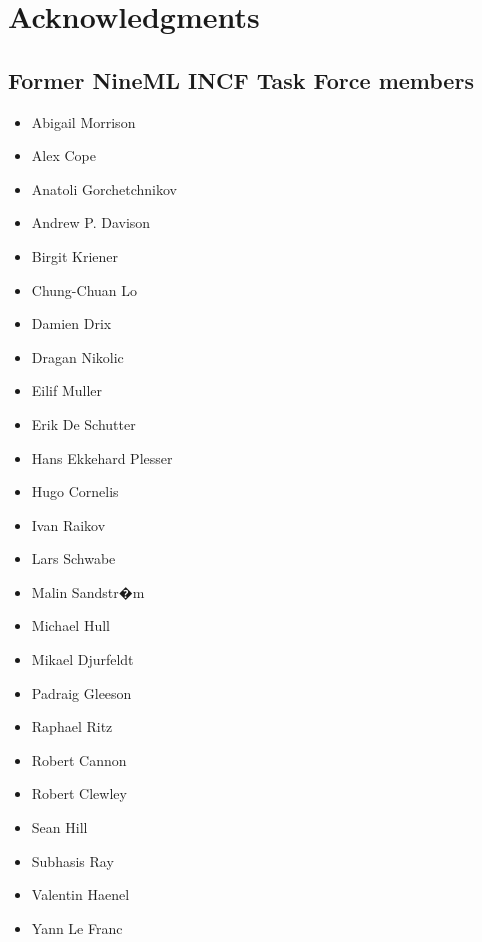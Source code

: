 \documentclass[draftspec]{ninemlspec}
\begin{document}
\section{Acknowledgments}
\subsection{Former NineML INCF Task Force members}
\begin{multicols}{2}
\begin{itemize}
\item Abigail Morrison
\item Alex Cope
\item Anatoli Gorchetchnikov
\item Andrew P. Davison
\item Birgit Kriener
\item Chung-Chuan Lo
\item Damien Drix
\item Dragan Nikolic
\item Eilif Muller
\item Erik De Schutter
\item Hans Ekkehard Plesser
\item Hugo Cornelis
\item Ivan Raikov
\item Lars Schwabe
\item Malin Sandstr�m
\item Michael Hull
\item Mikael Djurfeldt
\item Padraig Gleeson
\item Raphael Ritz
\item Robert Cannon
\item Robert Clewley
\item Sean Hill
\item Subhasis Ray
\item Valentin Haenel
\item Yann Le Franc
\end{itemize}
\end{multicols}

\clearpage


\end{document}

